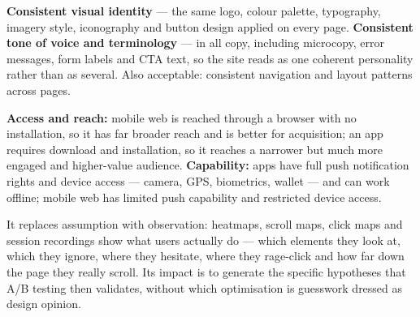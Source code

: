 \begin{qlist}
\textbf{Consistent visual identity} --- the same logo, colour palette,
typography, imagery style, iconography and button design applied on every page.
\textbf{Consistent tone of voice and terminology} --- in all copy, including
microcopy, error messages, form labels and CTA text, so the site reads as one
coherent personality rather than as several. Also acceptable: consistent
navigation and layout patterns across pages.

\textbf{Access and reach:} mobile web is reached through a browser with no
installation, so it has far broader reach and is better for acquisition; an app
requires download and installation, so it reaches a narrower but much more
engaged and higher-value audience. \textbf{Capability:} apps have full push
notification rights and device access --- camera, GPS, biometrics, wallet ---
and can work offline; mobile web has limited push capability and restricted
device access.

It replaces assumption with observation: heatmaps, scroll maps, click maps and
session recordings show what users actually do --- which elements they look at,
which they ignore, where they hesitate, where they rage-click and how far down
the page they really scroll. Its impact is to generate the specific hypotheses
that A/B testing then validates, without which optimisation is guesswork
dressed as design opinion.

\end{qlist}

\partb

